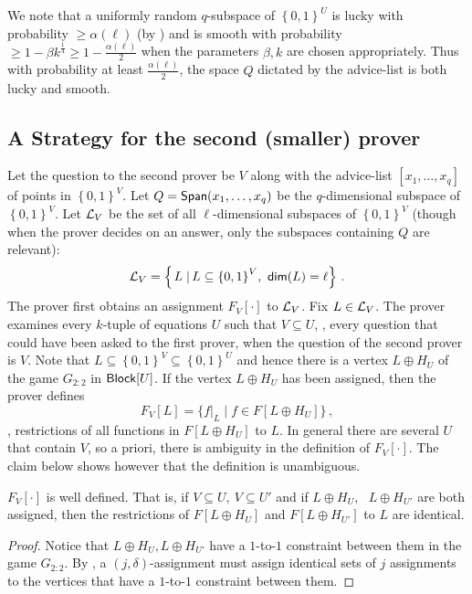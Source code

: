 \documentclass{toc}
\newcommand\sett[2]{\left\{ \left. #1 \;\right\vert #2 \right\}}
\newcommand\set[1]{{\left\{ #1 \right\}}}
\newcommand\power[1]{\set{0,1}^{#1}}
\newcommand*\xor{\mathbin{\oplus}}
\renewcommand\geq{\geqslant}
\begin{document}
We note that a uniformly random $q$-subspace of $\power{U}$ is lucky with probability $\geq \alpha(\ell)$ (by )
and is smooth with probability $\geq 1-\beta k^{\frac{1}{4}} \geq 1- \frac{\alpha(\ell)}{2}$ when the parameters $\beta, k$ are
chosen appropriately.
Thus with probability at least $\frac{\alpha(\ell)}{2}$, the space $Q$ dictated by the advice-list is both lucky and smooth.


\subsection{A Strategy for the second (smaller) prover}
Let the question to the second prover be $V$ along with the advice-list  $[x_1, \ldots, x_q]$ of points in $\power{V}$. Let
$Q = {\sf Span}(x_1,\ldots,x_q)$ be the $q$-dimensional subspace of $\power{V}$. Let ${\cal L}_V$ be the set of all $\ell$-dimensional
subspaces of $\power{V}$ (though when the prover decides on an answer, only the subspaces containing $Q$ are relevant):
\[
{\cal L}_V =\sett{L}{L\subseteq \power{V}, ~{\sf dim}(L)=\ell}\,.%
\]
The prover first obtains an assignment $F_V[\cdot]$ to ${\cal L}_V$. Fix
 $L\in {\cal L}_V$. The prover examines every $k$-tuple of equations $U$ such that $V \subseteq U$, \ie, every question that could
 have been asked to the
 first prover, when the question of the second prover is $V$. Note that $L \subseteq \power{V} \subseteq \power{U}$ and hence there is a vertex $L\xor H_U$
 of the game $G_{2:2}$ in ${\sf Block}[U]$. If the vertex $L\xor H_U$ has been assigned, then the prover defines
\[
F_V[L]  = \{ f|_L  \mid f \in F[L\xor H_U] \}\,,%
\]
\ie, restrictions of all functions in $F[L\xor H_U]$ to $L$. In general there are several $U$ that contain $V$, so a priori, there is ambiguity
in the definition of $F_V[\cdot]$. The claim below shows however that the definition is unambiguous.
\begin{claim}
$F_{V}[\cdot]$ is well defined. That is, if $V \subseteq U, ~V \subseteq U'$ and if $L\xor H_{U}$, ~$L\xor H_{U'}$ are both assigned, then the
restrictions of $F[L\xor H_{U}]$ and $F[L\xor H_{U'}]$ to $L$ are identical.
\end{claim}
\begin{proof}
Notice that $L\xor H_{U}, L\xor H_{U'}$ have a $1$-to-$1$ constraint between them in the game $G_{2:2}$. By , a $(j,\delta)$-assignment
must assign identical sets of $j$ assignments to the vertices that have a $1$-to-$1$ constraint between them.
\end{proof}
\end{document}
